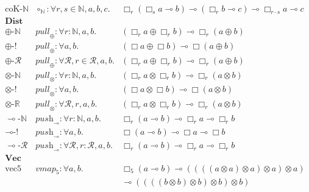 {{\begin{figure}
\begin{align*}
\begin{array}{r|rll}
\text{coK-$\mathbb{N}$} & \circ_{\mathbb{N}} :
\forall r, s \in \mathbb{N}, a, b, c . &
      \Box_r (\Box_s a \multimap b) \multimap (\Box_r b \multimap c) \multimap \Box_{r \cdot s} a \multimap c
\\ \hline
\textbf{Dist} & \\ \hline
\text{$\oplus$-$\mathbb{N}$} & \textit{pull}_\oplus : \forall r :
                               \mathbb{N}, a, b . & (\Box_r a \oplus \Box_r b) \multimap \Box_r (a \oplus b) \\
\text{$\oplus$-!} &  \textit{pull}_\oplus : \forall a, b . & (\Box a \oplus \Box b) \multimap \Box (a \oplus b) \\
\text{$\oplus$-$\mathcal{R}$} & \textit{pull}_\oplus : \forall
                                \mathcal{R}, r \in \mathcal{R}, a, b
                                . &  (\Box_r a \oplus \Box_r b) \multimap \Box_r (a \oplus b) \\
\text{$\otimes$-$\mathbb{N}$} & \textit{pull}_\otimes : \forall r :
                                \mathbb{N}, a, b . & (\Box_r a \otimes \Box_r b) \multimap \Box_r (a \otimes b) \\
\text{$\otimes$-!} & \textit{pull}_\otimes : \forall a, b . & (\Box a \otimes \Box b) \multimap \Box (a \otimes b) \\
\text{$\otimes$-$\mathbb{R}$} & \textit{pull}_\otimes : \forall
                                  \mathcal{R}, r,
                                  a, b . & (\Box_r a \otimes \Box_r b) \multimap \Box_r (a \otimes b)  \\
\text{$\multimap$-$\mathbb{N}$} & \textit{push}_\multimap : \forall r
                                  : \mathbb{N}, a, b . & \Box_r (a \multimap b) \multimap \Box_r a \multimap \Box_r b \\
\text{$\multimap$-!} & \textit{push}_\multimap : \forall a, b . & \Box (a \multimap b) \multimap \Box a \multimap \Box b \\
\text{$\multimap$-$\mathcal{R}$} & \textit{push}_\multimap : \forall
                                   \mathcal{R}, r : \mathcal{R}, a, b
                                   .& \Box_r (a \multimap b) \multimap \Box_r a \multimap \Box_r b \\ \hline
\textbf{Vec} \\ \hline
\text{vec5} & \textit{vmap}_5 : \forall a, b . & \Box_5 (a \multimap b) \multimap ((((a \otimes a) \otimes a) \otimes a) \otimes a) \\
& & \multimap ((((b \otimes b) \otimes b) \otimes b) \otimes b) \\

\end{array}
\end{align*}
\end{figure}}}
